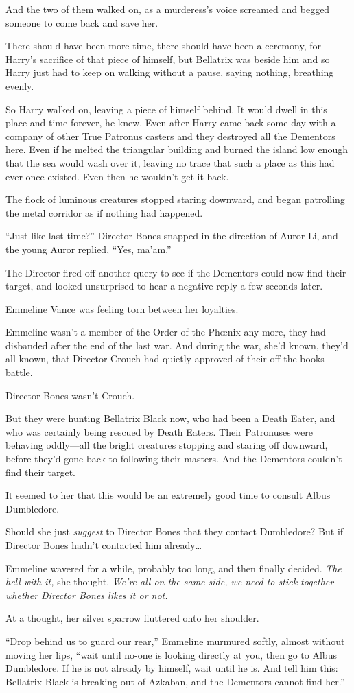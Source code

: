 And the two of them walked on, as a murderess’s voice screamed and begged someone to come back and save her.

There should have been more time, there should have been a ceremony, for Harry’s sacrifice of that piece of himself, but Bellatrix was beside him and so Harry just had to keep on walking without a pause, saying nothing, breathing evenly.

So Harry walked on, leaving a piece of himself behind. It would dwell in this place and time forever, he knew. Even after Harry came back some day with a company of other True Patronus casters and they destroyed all the Dementors here. Even if he melted the triangular building and burned the island low enough that the sea would wash over it, leaving no trace that such a place as this had ever once existed. Even then he wouldn’t get it back.

\later

The flock of luminous creatures stopped staring downward, and began patrolling the metal corridor as if nothing had happened.

“Just like last time?” Director Bones snapped in the direction of Auror Li, and the young Auror replied, “Yes, ma’am.”

The Director fired off another query to see if the Dementors could now find their target, and looked unsurprised to hear a negative reply a few seconds later.

Emmeline Vance was feeling torn between her loyalties.

Emmeline wasn’t a member of the Order of the Phœnix any more, they had disbanded after the end of the last war. And during the war, she’d known, they’d all known, that Director Crouch had quietly approved of their off-the-books battle.

Director Bones wasn’t Crouch.

But they were hunting Bellatrix Black now, who had been a Death Eater, and who was certainly being rescued by Death Eaters. Their Patronuses were behaving oddly—all the bright creatures stopping and staring off downward, before they’d gone back to following their masters. And the Dementors couldn’t find their target.

It seemed to her that this would be an extremely good time to consult Albus Dumbledore.

Should she just \emph{suggest} to Director Bones that they contact Dumbledore? But if Director Bones hadn’t contacted him already…

Emmeline wavered for a while, probably too long, and then finally decided. \emph{The hell with it,} she thought. \emph{We’re all on the same side, we need to stick together whether Director Bones likes it or not.}

At a thought, her silver sparrow fluttered onto her shoulder.

“Drop behind us to guard our rear,” Emmeline murmured softly, almost without moving her lips, “wait until no-one is looking directly at you, then go to Albus Dumbledore. If he is not already by himself, wait until he is. And tell him this: Bellatrix Black is breaking out of Azkaban, and the Dementors cannot find her.”

